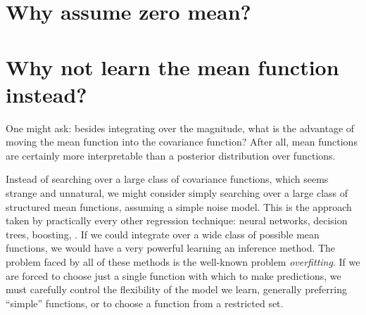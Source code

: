 








\outbpdocument{


}




\iffalse
\section{Why assume zero mean?}

\section{Why not learn the mean function instead?}
One might ask: besides integrating over the magnitude, what is the advantage of moving the mean function into the covariance function?
After all, mean functions are certainly more interpretable than a posterior distribution over functions.

Instead of searching over a large class of covariance functions, which seems strange and unnatural, we might consider simply searching over a large class of structured mean functions, assuming a simple \iid noise model.
This is the approach taken by practically every other regression technique: neural networks, decision trees, boosting, \etc.
If we could integrate over a wide class of possible mean functions, we would have a very powerful learning an inference method.
The problem faced by all of these methods is the well-known problem \emph{overfitting}.
If we are forced to choose just a single function with which to make predictions, we must carefully control the flexibility of the model we learn, generally preferring ``simple'' functions, or to choose a function from a restricted set.


